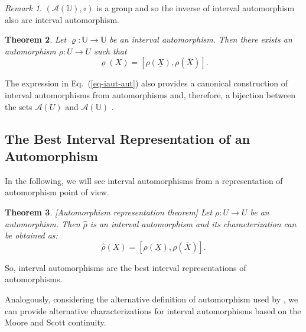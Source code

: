 \documentclass[12pt]{article}
\theoremstyle{plain}
\newtheorem{theorem}{Theorem}[section]
\newtheorem{corollary}[theorem]{Corollary}
\theoremstyle{remark}
\newtheorem{remark}[theorem]{Remark}
\theoremstyle{definition}
\theoremstyle{proposition}
\newcommand{\UU}{\mathbb{U} }
\begin{document}
\begin{remark} \label{rem-int-aut}
$(\mathcal{A}(\UU),\circ)$ is a group \cite{GWW96b,GWW98}  and so
the inverse of interval automorphism also are interval
automorphism.
\end{remark}

\begin{theorem}  \cite[Theorem 2]{GWW96b}\label{theo-int-aut-aut}
Let $\varrho:\UU \rightarrow \UU$ be an interval automorphism.
Then there exists an automorphism $\rho: U\rightarrow U$ such that
\begin{equation}
\varrho(X)=[\rho(\underline{X}),\rho(\overline{X})].\label{eq-iaut-aut}
\end{equation}
\end{theorem}


The expression in Eq.~(\ref{eq-iaut-aut}) also provides a
canonical construction of interval automorphisms from
automorphisms and, therefore, a bijection between the sets
$\mathcal{A}(U)$ and $\mathcal{A}(\UU)$ \cite[Theorem 3]{GWW96b}.

\subsection{The Best Interval Representation of an Automorphism}\vspace{-0.1cm}

In the following, we will see interval automorphisms from a representation of automorphism point of view.

\begin{theorem}\cite[Theorem 5.2]{BT06a}[Automorphism representation theorem] \label{theo-cir-aut}
Let $\rho:U\rightarrow U$ be an automorphism. Then
$\widehat{\rho}$ is an interval automorphism and its
characterization can be obtained as:
\begin{equation} \label{eq-aut-iaut}
\widehat{\rho}(X)=[\rho(\underline{X}),\rho(\overline{X})].
\end{equation}
\end{theorem}



So, interval automorphisms are the best interval representations of automorphisms.

%
%
Analogously, considering the  alternative definition  of
automorphism used by \cite{BBS03},  we   can  provide alternative
characterizations  for interval automorphisms based on the Moore
and Scott continuity.
\end{document}
